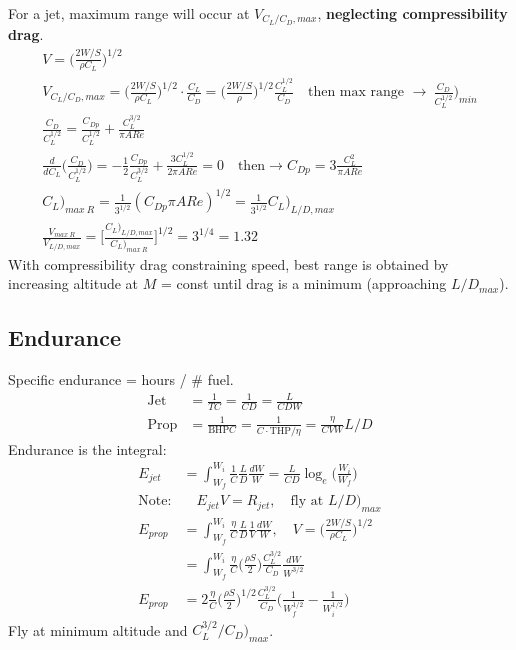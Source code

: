 \documentclass[draft=false, titlepage]{article}
\begin{document}
For a jet, maximum range will occur at $V_{C_L/C_D,max}$, \textbf{neglecting compressibility drag}.
\begin{gather*}
V = \Big(\frac{2W/S}{\rho C_L}\Big)^{1/2}\\
V_{C_L/C_D,max} = \Big(\frac{2W/S}{\rho C_L}\Big)^{1/2} \cdot \frac{C_L}{C_D} = \Big(\frac{2W/S}{\rho}\Big)^{1/2}\frac{C_L^{1/2}}{C_D}\quad
\text{then max range }\rightarrow\ \frac{C_D}{C_L^{1/2}}\Big)_{min}\\
\frac{C_D}{C_L^{1/2}} = \frac{C_{Dp}}{C_L^{1/2}} + \frac{C_L^{3/2}}{\pi AR e}\\
\frac{d}{dC_L} \Big(\frac{C_D}{C_L^{1/2}}\Big) = -\frac{1}{2}\frac{C_{Dp}}{C_L^{3/2}} + \frac{3C_L^{1/2}}{2\pi AR e} = 0\quad \text{then} 
\rightarrow C_{Dp} = 3\frac{C_L^2}{\pi AR e}\\
C_L\Big)_{max\ R} = \frac{1}{3^{1/2}} (C_{Dp}\pi AR e)^{1/2} = \frac{1}{3^{1/2}}C_L\Big)_{L/D,max}\\
\frac{V_{max\ R}}{V_{L/D,max}} = \Big[\frac{C_L\big)_{L/D,max}}{C_L\big)_{max\ R}}\Big]^{1/2} = 3^{1/4} = 1.32
\end{gather*}
With compressibility drag constraining speed, best range is obtained by increasing altitude at $M$ = const until drag is a minimum (approaching $L/D_{max}$).

\subsection{Endurance}
Specific endurance = hours / \# fuel.
\begin{align}
\text{Jet} &= \frac{1}{TC} = \frac{1}{CD} = \frac{L}{CDW}\\
\text{Prop} &= \frac{1}{\text{BHP}C} = \frac{1}{C\cdot\text{THP}/\eta} = \frac{\eta }{CVW}L/D
\end{align}
Endurance is the integral:
\begin{align*}
E_{jet} &= \int_{W_f}^{W_i} \frac{1}{C}\frac{L}{D}\frac{dW}{W} = \frac{L}{CD} \log_e \Big(\frac{W_i}{W_f}\Big)\\
\text{Note:} &\quad E_{jet} V = R_{jet},\quad \text{fly at } L/D\big)_{max}\\
E_{prop} &= \int_{W_f}^{W_i} \frac{\eta}{C} \frac{L}{D} \frac{1}{V} \frac{dW}{W},\quad V = \Big(\frac{2W/S}{\rho C_L}\Big)^{1/2}\\
 &= \int_{W_f}^{W_i} \frac{\eta}{C} \Big(\frac{\rho S}{2}\Big) \frac{C_L^{3/2}}{C_D} \frac{dW}{W^{3/2}}\\
E_{prop} &= 2\frac{\eta}{C} \Big(\frac{\rho S}{2}\Big)^{1/2} \frac{C_L^{3/2}}{C_D} \Big(\frac{1}{W_f^{1/2}} - \frac{1}{W_i^{1/2}}\Big)
\end{align*}
Fly at minimum altitude and $C_L^{3/2}/C_D\big)_{max}$.
\end{document}
